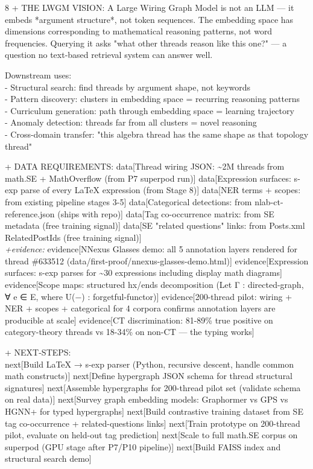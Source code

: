 \documentclass[landscape]{article}
\newcommand{\flexitag}[1]{\textcolor[gray]{0.35}{\textit{#1}}}
\begin{document}
\begin{paracol}{8}
  + THE LWGM VISION: A Large Wiring Graph Model is not an LLM — it embeds *argument structure*, not token sequences. The embedding space has dimensions corresponding to mathematical reasoning patterns, not word frequencies. Querying it asks "what other threads reason like this one?" — a question no text-based retrieval system can answer well.\\
\par
    Downstream uses:\\
    - Structural search: find threads by argument shape, not keywords\\
    - Pattern discovery: clusters in embedding space = recurring reasoning patterns\\
    - Curriculum generation: path through embedding space = learning trajectory\\
    - Anomaly detection: threads far from all clusters = novel reasoning\\
    - Cross-domain transfer: "this algebra thread has the same shape as that topology thread"\\
\par
  + DATA REQUIREMENTS: data[Thread wiring JSON: \textasciitilde{}2M threads from math.SE + MathOverflow (from P7 superpod run)] data[Expression surfaces: s-exp parse of every LaTeX expression (from Stage 8)] data[NER terms + scopes: from existing pipeline stages 3-5] data[Categorical detections: from nlab-ct-reference.json (ships with repo)] data[Tag co-occurrence matrix: from SE metadata (free training signal)] data[SE "related questions" links: from Posts.xml RelatedPostIds (free training signal)]\\
  \flexitag{+evidence:} evidence[NNexus Glasses demo: all 5 annotation layers rendered for thread \#633512 (data/first-proof/nnexus-glasses-demo.html)] evidence[Expression surfaces: s-exp parses for \textasciitilde{}30 expressions including display math diagrams] evidence[Scope maps: structured hx/ends decomposition (Let Γ : directed-graph, ∀ e ∈ E, where U(−) : forgetful-functor)] evidence[200-thread pilot: wiring + NER + scopes + categorical for 4 corpora confirms annotation layers are producible at scale] evidence[CT discrimination: 81-89\% true positive on category-theory threads vs 18-34\% on non-CT — the typing works]\\
\par
  + NEXT-STEPS:\\
    next[Build LaTeX → s-exp parser (Python, recursive descent, handle common math constructs)] next[Define hypergraph JSON schema for thread structural signatures] next[Assemble hypergraphs for 200-thread pilot set (validate schema on real data)] next[Survey graph embedding models: Graphormer vs GPS vs HGNN+ for typed hypergraphs] next[Build contrastive training dataset from SE tag co-occurrence + related-questions links] next[Train prototype on 200-thread pilot, evaluate on held-out tag prediction] next[Scale to full math.SE corpus on superpod (GPU stage after P7/P10 pipeline)] next[Build FAISS index and structural search demo]\\

\end{paracol}
\end{document}
